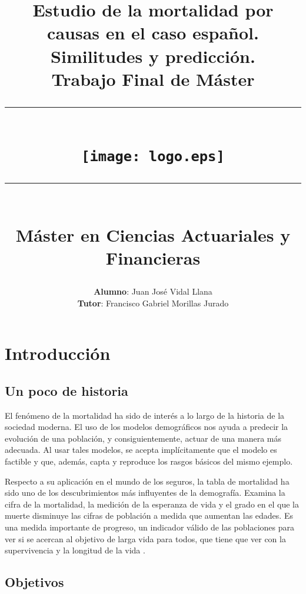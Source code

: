\documentclass{article}
\title{\textbf{Estudio de la mortalidad por causas en el caso español. Similitudes y predicción.}\\ \vspace{0.4cm} \textbf{Trabajo Final de Máster} \\ \rule{12cm}{0.5mm} \\ \vspace{1cm}
\texttt{[image: logo.eps]} 
\vspace{0.4cm}\rule{12cm}{0.5mm}  \\ \textbf{Máster en Ciencias Actuariales y Financieras}}
\author{\textbf{Alumno}: Juan José Vidal Llana \\ \textbf{Tutor}: Francisco Gabriel Morillas Jurado}
\date{\textbf{Curso 2016-2017} \\  \rule{9cm}{0.2mm} \\ \vspace{0.2cm}\textbf{Departamento de Economía Aplicada y Actuarial}}
\begin{document}
\maketitle
\thispagestyle{empty}
\newpage{\ }
\thispagestyle{empty}

\newpage
\tableofcontents

\newpage
\section{Introducción}

\subsection*{Un poco de historia}

El fenómeno de la mortalidad ha sido de interés a lo largo de la historia de la sociedad moderna. El uso de los modelos demográficos nos ayuda a predecir la evolución de una población, y consiguientemente, actuar de una manera más adecuada. Al usar tales modelos, se acepta implícitamente que el modelo es factible y que, además, capta y reproduce los rasgos básicos del mismo ejemplo.
\newline

\newline
Respecto a su aplicación en el mundo de los seguros, la tabla de mortalidad ha sido uno de los descubrimientos más influyentes de la demografía. Examina la cifra de la mortalidad, la medición de la esperanza de vida y el grado en el que la muerte disminuye las cifras de población a medida que aumentan las edades. Es una medida importante de progreso, un indicador válido de las poblaciones para ver si se acercan al objetivo de larga vida para todos, que tiene que ver con la supervivencia y la longitud de la vida \cite{cunningham1999kinetic}.


\subsection*{Objetivos}
\end{document}
